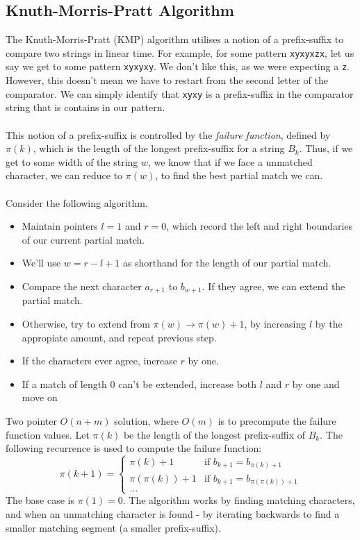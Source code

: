 \documentclass[journal, letterpaper]{IEEEtran}
\begin{document}
  \subsection{Knuth-Morris-Pratt Algorithm}
  The Knuth-Morris-Pratt (KMP) algorithm utilises a notion of a prefix-suffix to compare two strings
  in linear time. For example, for some pattern \verb|xyxyxzx|, let us say we get to some
  pattern \verb|xyxyxy|. We don't like this, as we were expecting a \verb|z|. However, this
  doesn't mean we have to restart from the second letter of the comparator. We can simply identify that
  \verb|xyxy| is a prefix-suffix in the comparator string that is contains in our pattern. \\ \\ 
  This notion of a prefix-suffix is controlled by the \emph{failure function}, defined by $\pi(k)$, which is the length
  of the longest prefix-suffix for a string $B_k$. Thus, if we get to some width of the string $w$, we know that if we face
  a unmatched character, we can reduce to $\pi(w)$, to find the best partial match we can. \\ \\ Consider the following algorithm. 
  \begin{itemize}
    \item Maintain pointers $l = 1$ and $r = 0$, which record the left and right boundaries of our current partial match. 
    \item We'll use $w = r - l + 1$ as shorthand for the length of our partial match.
    \item Compare the next character $a_{r + 1}$ to $b_{w + 1}$. If they agree, we can extend the partial match.
    \item Otherwise, try to extend from $\pi(w) \to \pi(w) + 1$, by increasing $l$ by the appropiate amount, and repeat previous
      step.
    \item If the characters ever agree, increase $r$ by one.
    \item If a match of length $0$ can't be extended, increase both $l$ and $r$ by one and move on
  \end{itemize}
  Two pointer $O(n + m)$ solution, where $O(m)$ is to precompute the failure function values. \newpage
  Let $\pi(k)$ be the length of the longest prefix-suffix of $B_k$.
  The following recurrence is used
  to compute the failure function:
  \[\pi(k + 1) = \begin{cases}
    \pi(k) + 1 & \text{if } b_{k + 1} = b_{\pi(k) + 1} \\ 
    \pi(\pi(k)) + 1 & \text{if } b_{k + 1} = b_{\pi(\pi(k)) + 1} \\ 
    \ldots
  \end{cases}\]
  The base case is $\pi(1) = 0$. The algorithm works by finding matching characters,
  and when an unmatching character is found - by iterating backwards to find a smaller matching
  segment (a smaller prefix-suffix).
\end{document}
